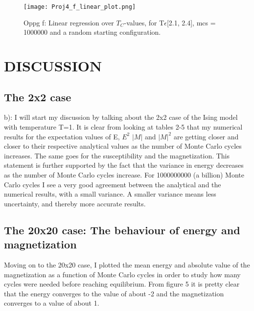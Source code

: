 \documentclass[twocolumn]{article}
\begin{document}
\begin{figure}[h!]
  \centering
  \caption{Oppg f: Linear regression over $T_C$-values, for T$\epsilon$[2.1, 2.4], mcs = 1000000 and a random starting configuration.}
  \texttt{[image: Proj4\_f\_linear\_plot.png]}
\end{figure}

\newpage
\newpage
\newpage
\newpage
\newpage
\twocolumngrid
\section{DISCUSSION}
\subsection{The 2x2 case}
b):\newline
I will start my discussion by talking about the 2x2 case of the Ising model with temperature T=1. It is clear from looking at tables 2-5 that my numerical results for the expectation values of E, $E^2$ $|M|$ and $|M|^2$ are getting closer and closer to their respective analytical values as the number of Monte Carlo cycles increases. The same goes for the susceptibility and the magnetization. This statement is further supported by the fact that the variance in energy decreases as the number of Monte Carlo cycles increase. For 1000000000 (a billion) Monte Carlo cycles I see a very good agreement between the analytical and the numerical results, with a small variance. A smaller variance means less uncertainty, and thereby more accurate results.\newline

\subsection{The 20x20 case: The behaviour of energy and magnetization}

Moving on to the 20x20 case, I plotted the mean energy and absolute value of the magnetization as a function of Monte Carlo cycles in order to study how many cycles were needed before reaching equilibrium. From figure 5 it is pretty clear that the energy converges to the value of about -2 and the magnetization converges to a value of about 1.\newline
\end{document}
